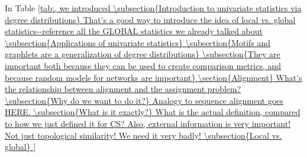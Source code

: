 \documentclass[12pt]{thesis}
\theoremstyle{plain}
\theoremstyle{definition}
\theoremstyle{remark}
\begin{document}
In Table \ref{tab:, we introduced 

\subsection{Introduction to univariate statistics via degree distributions}

That's a good way to introduce the idea of local vs. global statistics--reference all the GLOBAL statistics we already talked about

\subsection{Applications of univariate statistics}

\subsection{Motifs and graphlets are a generalization of degree distributions}

\subsection{They are important both because they can be used to create comparison metrics, and because random models for networks are important}

\section{Alignment}

What's the relationship between alignment and the assignment problem?

\subsection{Why do we want to do it?}

Analogy to sequence alignment goes HERE.

\subsection{What is it exactly?}

What is the actual definition, compared to how we just defined it for CS? Also, external information is very important! Not just topological similarity! We need it very badly!

\subsection{Local vs. global}

}
\end{document}
